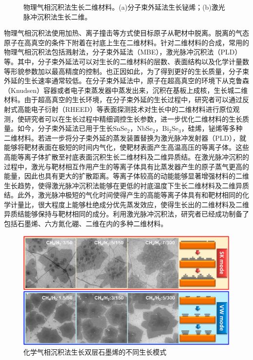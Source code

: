 \begin{figure}
{        }
        \caption{物理气相沉积法生长二维材料。(a)分子束外延法生长铋烯；(b)激光脉冲沉积法生长二维。}
    \end{figure}

    物理气相沉积法使用加热、离子撞击等方式使目标原子从靶材中脱离。脱离的气态原子在高真空的条件下附着在衬底上生在二维材料。针对二维材料的合成，常用的物理气相沉积法包括溅射法，分子束外延法（MBE），激光脉冲沉积法（PLD）等。其中，分子束外延法可以对生长的二维材料的层数、表面结构以及化学计量数等形貌参数加以最高精度的控制。也正因如此，为了得到更好的生长质量，分子束外延的生长速率通常较低。在分子束外延法中，原子在超高真空的环境下从克鲁森（Knudsen）容器或者电子束蒸发器中蒸发出来，沉积在基板上成核，生长城二维材料。由于超高真空的生长环境，在分子束外延的生长过程中，研究者可以通过反射式高能电子衍射（RHEED）等表面探测技术对生长中的二维材料进行原位观测，使研究者可以在生长过程中精细调控生长参数，进一步优化二维材料的生长质量。如今，分子束外延法已用于生长SnSe$_2$，NbSe$_2$，Bi$_2$Se$_3$，硅烯，铋烯等多种二维材料。若进一步将分子束外延的蒸发装置替换为激光脉冲发射器（PLD），就能够将靶材表面在极短的时间内气化，使靶材表面产生高温高压的等离子体。这些高能等离子体扩散至衬底表面沉积生长二维材料及二维异质结。在激光脉冲沉积的过程中，激光与靶材相互作用产生的等离子体具有比蒸发器产生的原子蒸气更高的能量，因此也具有更大的扩散距离。等离子体较高的动能能够显著增强材料的二维生长趋势，使得激光脉冲沉积法能够在更低的衬底温度下生长二维材料及二维异质结。此外，激光脉冲极短的气化时间使得产生的高能等离子体具有和靶材相同的化学计量比，很大程度上能够杜绝成分优先蒸发效应，使得生长出的二维材料及二维异质结能够保持与靶材相同的成分。利用激光脉冲沉积法，研究者已经成功制备了包括石墨烯、六方氮化硼、二维在内的多种二维材料。

    \begin{figure}[htb]
        \includegraphics{pic/INTRO_growth_grapheneGrowthMode.png}
        \caption{化学气相沉积法生长双层石墨烯的不同生长模式}
    \end{figure}

